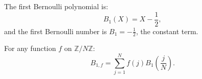 The first Bernoulli polynomial is:
$$B_1(X) = X - \frac{1}{2},$$
and the first Bernoulli number is $B_1 = -\frac{1}{2}$, the constant term.

For any function $f$ on $\mathbb{Z}/N\mathbb{Z}$:
$$B_{1,f} = \sum_{j=1}^{N} f(j) B_1\left(\frac{j}{N}\right).$$
